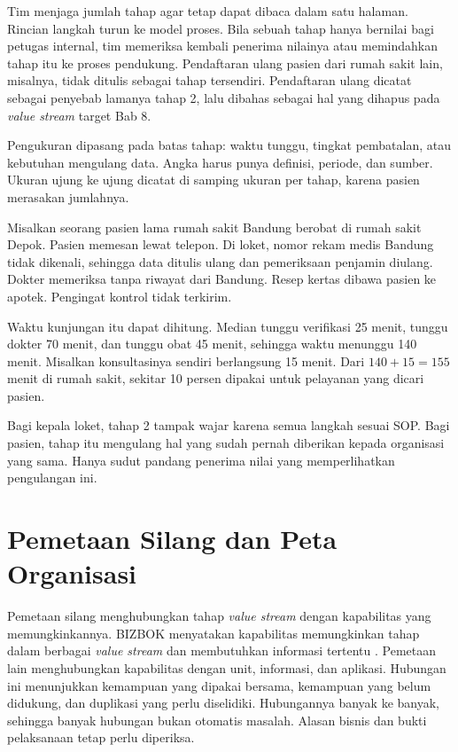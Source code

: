 Tim menjaga jumlah tahap agar tetap dapat dibaca dalam satu halaman. Rincian langkah turun ke
model proses. Bila sebuah tahap hanya bernilai bagi petugas internal, tim memeriksa kembali
penerima nilainya atau memindahkan tahap itu ke proses pendukung. Pendaftaran ulang pasien dari
rumah sakit lain, misalnya, tidak ditulis sebagai tahap tersendiri. Pendaftaran ulang dicatat
sebagai penyebab lamanya tahap 2, lalu dibahas sebagai hal yang dihapus pada \textit{value
stream} target Bab 8.

Pengukuran dipasang pada batas tahap: waktu tunggu, tingkat pembatalan, atau kebutuhan mengulang
data. Angka harus punya definisi, periode, dan sumber. Ukuran ujung ke ujung dicatat di samping
ukuran per tahap, karena pasien merasakan jumlahnya.

\begin{kasus}[title={Kasus Medikara Health: Satu Kunjungan dari Sudut Pandang Pasien}]
  Misalkan seorang pasien lama rumah sakit Bandung berobat di rumah sakit Depok. Pasien memesan
  lewat telepon. Di loket, nomor rekam medis Bandung tidak dikenali, sehingga data ditulis ulang
  dan pemeriksaan penjamin diulang. Dokter memeriksa tanpa riwayat dari Bandung. Resep kertas
  dibawa pasien ke apotek. Pengingat kontrol tidak terkirim.

  Waktu kunjungan itu dapat dihitung. Median tunggu verifikasi 25 menit, tunggu dokter 70 menit,
  dan tunggu obat 45 menit, sehingga waktu menunggu 140 menit. Misalkan konsultasinya sendiri
  berlangsung 15 menit. Dari $140 + 15 = 155$ menit di rumah sakit, sekitar 10 persen dipakai
  untuk pelayanan yang dicari pasien.

  Bagi kepala loket, tahap 2 tampak wajar karena semua langkah sesuai SOP. Bagi pasien, tahap
  itu mengulang hal yang sudah pernah diberikan kepada organisasi yang sama. Hanya sudut pandang
  penerima nilai yang memperlihatkan pengulangan ini.
\end{kasus}

\section{Pemetaan Silang dan Peta Organisasi}

Pemetaan silang menghubungkan tahap \textit{value stream} dengan kapabilitas yang
memungkinkannya. BIZBOK menyatakan kapabilitas memungkinkan tahap dalam berbagai \textit{value
stream} dan membutuhkan informasi tertentu \cite{bizbok15}. Pemetaan lain menghubungkan
kapabilitas dengan unit, informasi, dan aplikasi. Hubungan ini menunjukkan kemampuan yang dipakai
bersama, kemampuan yang belum didukung, dan duplikasi yang perlu diselidiki. Hubungannya banyak ke
banyak, sehingga banyak hubungan bukan otomatis masalah. Alasan bisnis dan bukti pelaksanaan tetap
perlu diperiksa.

